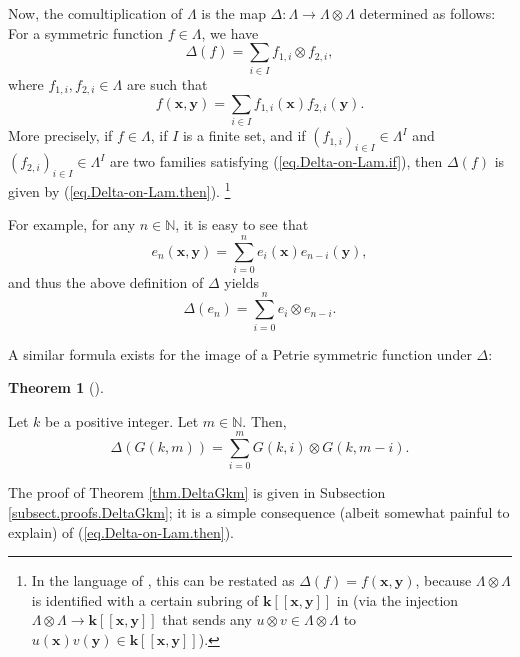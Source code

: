 \documentclass[numbers=enddot,12pt,final,onecolumn,notitlepage]{scrartcl}%
\theoremstyle{definition}
\newtheorem{theo}{Theorem}[section]
\newenvironment{theorem}[1][]
{\begin{theo}[#1]\begin{leftbar}}
{\end{leftbar}\end{theo}}
\let\sumnonlimits\sum
\renewcommand{\sum}{\sumnonlimits\limits}
\begin{document}
Now, the comultiplication of $\Lambda$ is the map $\Delta:\Lambda
\rightarrow\Lambda\otimes\Lambda$ determined as follows: For a symmetric
function $f\in\Lambda$, we have%
\begin{equation}
\Delta\left(  f\right)  =\sum_{i\in I}f_{1,i}\otimes f_{2,i},
\label{eq.Delta-on-Lam.then}%
\end{equation}
where $f_{1,i},f_{2,i}\in\Lambda$ are such that%
\begin{equation}
f\left(  \mathbf{x},\mathbf{y}\right)  =\sum_{i\in I}f_{1,i}\left(
\mathbf{x}\right)  f_{2,i}\left(  \mathbf{y}\right)  .
\label{eq.Delta-on-Lam.if}%
\end{equation}
More precisely, if $f\in\Lambda$, if $I$ is a finite set, and if $\left(
f_{1,i}\right)  _{i\in I}\in\Lambda^{I}$ and $\left(  f_{2,i}\right)  _{i\in
I}\in\Lambda^{I}$ are two families satisfying (\ref{eq.Delta-on-Lam.if}), then
$\Delta\left(  f\right)  $ is given by (\ref{eq.Delta-on-Lam.then}).
\footnote{In the language of \cite[\S 2.1]{GriRei}, this can be restated as
$\Delta\left(  f\right)  =f\left(  \mathbf{x},\mathbf{y}\right)  $, because
$\Lambda\otimes\Lambda$ is identified with a certain subring of $\mathbf{k}%
\left[  \left[  \mathbf{x},\mathbf{y}\right]  \right]  $ in \cite[\S 2.1]%
{GriRei} (via the injection $\Lambda\otimes\Lambda\rightarrow\mathbf{k}\left[
\left[  \mathbf{x},\mathbf{y}\right]  \right]  $ that sends any $u\otimes
v\in\Lambda\otimes\Lambda$ to $u\left(  \mathbf{x}\right)  v\left(
\mathbf{y}\right)  \in\mathbf{k}\left[  \left[  \mathbf{x},\mathbf{y}\right]
\right]  $).}

For example, for any $n\in\mathbb{N}$, it is easy to see that%
\[
e_{n}\left(  \mathbf{x},\mathbf{y}\right)  =\sum_{i=0}^{n}e_{i}\left(
\mathbf{x}\right)  e_{n-i}\left(  \mathbf{y}\right)  ,
\]
and thus the above definition of $\Delta$ yields%
\[
\Delta\left(  e_{n}\right)  =\sum_{i=0}^{n}e_{i}\otimes e_{n-i}.
\]


A similar formula exists for the image of a Petrie symmetric function under
$\Delta$:

\begin{theorem}
\label{thm.DeltaGkm}Let $k$ be a positive integer. Let $m\in\mathbb{N}$. Then,%
\[
\Delta\left(  G\left(  k,m\right)  \right)  =\sum_{i=0}^{m}G\left(
k,i\right)  \otimes G\left(  k,m-i\right)  .
\]

\end{theorem}

The proof of Theorem \ref{thm.DeltaGkm} is given in Subsection
\ref{subsect.proofs.DeltaGkm}; it is a simple consequence (albeit somewhat
painful to explain) of (\ref{eq.Delta-on-Lam.then}).
\end{document}
